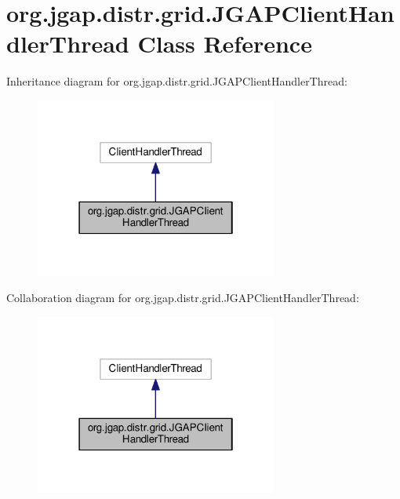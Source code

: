 \hypertarget{classorg_1_1jgap_1_1distr_1_1grid_1_1_j_g_a_p_client_handler_thread}{\section{org.\-jgap.\-distr.\-grid.\-J\-G\-A\-P\-Client\-Handler\-Thread Class Reference}
\label{classorg_1_1jgap_1_1distr_1_1grid_1_1_j_g_a_p_client_handler_thread}
}


Inheritance diagram for org.\-jgap.\-distr.\-grid.\-J\-G\-A\-P\-Client\-Handler\-Thread\-:
\nopagebreak
\begin{figure}[H]
\begin{center}
\leavevmode
\includegraphics[width=226pt]{classorg_1_1jgap_1_1distr_1_1grid_1_1_j_g_a_p_client_handler_thread__inherit__graph}
\end{center}
\end{figure}


Collaboration diagram for org.\-jgap.\-distr.\-grid.\-J\-G\-A\-P\-Client\-Handler\-Thread\-:
\nopagebreak
\begin{figure}[H]
\begin{center}
\leavevmode
\includegraphics[width=226pt]{classorg_1_1jgap_1_1distr_1_1grid_1_1_j_g_a_p_client_handler_thread__coll__graph}
\end{center}
\end{figure}
